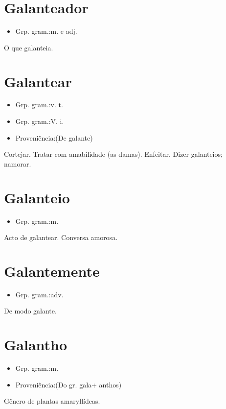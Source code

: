 \section{Galanteador}
\begin{itemize}
\item {Grp. gram.:m.  e  adj.}
\end{itemize}
O que galanteia.
\section{Galantear}
\begin{itemize}
\item {Grp. gram.:v. t.}
\end{itemize}
\begin{itemize}
\item {Grp. gram.:V. i.}
\end{itemize}
\begin{itemize}
\item {Proveniência:(De \textunderscore galante\textunderscore )}
\end{itemize}
Cortejar.
Tratar com amabilidade (as damas).
Enfeitar.
Dizer galanteios; namorar.
\section{Galanteio}
\begin{itemize}
\item {Grp. gram.:m.}
\end{itemize}
Acto de galantear.
Conversa amorosa.
\section{Galantemente}
\begin{itemize}
\item {Grp. gram.:adv.}
\end{itemize}
De modo galante.
\section{Galantho}
\begin{itemize}
\item {Grp. gram.:m.}
\end{itemize}
\begin{itemize}
\item {Proveniência:(Do gr. \textunderscore gala\textunderscore  + \textunderscore anthos\textunderscore )}
\end{itemize}
Gênero de plantas amaryllídeas.

